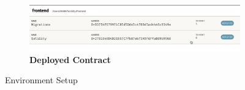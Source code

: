 \documentclass[12pt]{article}
\renewcommand{\_}{\kern-1.5pt\textunderscore\kern-1.5pt}
\begin{document}
\begin{figure}[H]
\begin{minipage}[t]{0.5\linewidth}
	\begin{subfigure}[t]{\textwidth}
	\captionsetup{justification   = raggedright,
              singlelinecheck = false}
		\centering
				\caption*{\textbf{Deployed Contract}}
		\includegraphics[width=\textwidth]{graphs/08. ganache_deployed_contract}
	\end{subfigure}

	\end{minipage}
	\caption{Environment Setup}
	\label{fig:setup0}
\end{figure}

\end{document}
